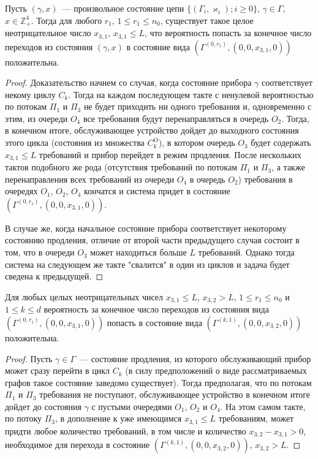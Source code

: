\documentclass[a4paper,12pt,russian]{extarticle}
\newcommand{\Mark}{\{(\Gamma_i, \varkappa_i); i \geqslant 0\}}
\begin{document}
\begin{lemma}
Пусть $(\gamma,x)$~--- произвольное состояние цепи $\Mark$, $\gamma\in \Gamma$, $x \in \mathbb{Z}_+^4$. Тогда для любого $r_1$, $1\leqslant r_1 \leqslant n_0$, существует такое целое неотрицательное число $x_{3,1}$, $x_{3,1} \leqslant L$, что вероятность попасть за конечное число переходов из состояния $(\gamma,x)$ в состояние вида $(\Gamma^{(0,r_1)}, (0,0,x_{3,1},0))$ положительна.
\label{lemma:1}
\end{lemma}
\begin{proof}
Доказательство начнем со случая, когда состояние прибора $\gamma$ соответствует некому циклу $C_k$. Тогда на каждом последующем такте с ненулевой вероятностью по потокам $\Pi_1$ и $\Pi_3$ не будет приходить ни одного требования и, одновременно с этим, из очереди $O_4$ все требования будут перенаправляться в очередь $O_2$. 
Тогда, в конечном итоге, обслуживающее устройство дойдет до выходного состояния этого цикла (состояния из множества $C_k^\mathrm{O}$), в котором очередь $O_3$ будет содержать $x_{3,1} \leqslant L$ требований и прибор перейдет в режим продления. После нескольких тактов подобного же рода (отсутствия требований по потокам $\Pi_1$ и $\Pi_3$, а также перенаправления всех требований из очереди $O_4$ в очередь $O_2$) требования в очередях $O_1$, $O_2$, $O_4$ кончатся и система придет в состояние $(\Gamma^{(0,r_1)}, (0,0,x_{3,1},0))$.

В случае же, когда начальное состояние прибора соответствует некоторому состоянию продления, отличие от второй части предыдущего случая состоит в том, что в очереди $O_3$ может находиться больше $L$ требований. Однако тогда система на следующем же такте "свалится" в один из циклов и задача будет сведена к предыдущей. 
\end{proof}

\begin{lemma}
Для любых целых неотрицательных чисел $x_{3,1} \leqslant L$, $x_{3,2} > L$, $1 \leqslant r_1 \leqslant n_0$ и $1 \leqslant k \leqslant d$ вероятность за конечное число переходов из состояния вида $(\Gamma^{(0,r_1)},(0,0,x_{3,1},0))$ попасть в состояние вида $(\Gamma^{(k,1)},(0,0,x_{3,2},0))$ положительна.
\label{lemma:2}
\end{lemma}
\begin{proof}
Пусть $\gamma \in \Gamma$~--- состояние продления, из которого обслуживающий прибор может сразу перейти в цикл $C_k$ (в силу предположений о виде рассматриваемых графов такое состояние заведомо существует). Тогда предполагая, что по потокам $\Pi_1$ и $\Pi_3$ требования не поступают, обслуживающее устройство в конечном итоге дойдет до состояния $\gamma$ с пустыми очередями $O_1$, $O_2$ и $O_4$. На этом самом такте, по потоку $\Pi_3$, в дополнение к уже имеющимся $x_{3,1} \leqslant L$ требованиям, может придти любое количество требований, в том числе и количество $x_{3,2} - x_{3,1} > 0$, необходимое для перехода в состояние $(\Gamma^{(k,1)},(0,0,x_{3,2},0))$, $x_{3,2} > L$.
\end{proof}
\end{document}

